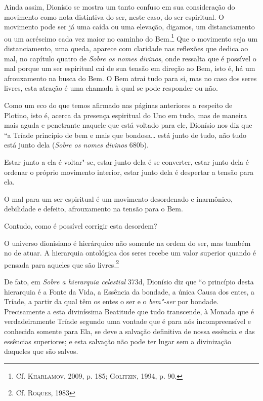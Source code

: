 Ainda assim, Dionísio se mostra um tanto confuso em sua consideração do
movimento como nota distintiva do ser, neste caso, do ser espiritual. O
movimento pode ser já uma caída ou uma elevação, digamos, um distanciamento ou
um acréscimo cada vez maior no caminho do Bem.\footnote{
  Cf. \textsc{Kharlamov}, 2009, p. 185; \textsc{Golitzin}, 1994, p. 90.}  
Que o movimento seja um
distanciamento, uma queda, aparece com claridade nas reflexões que dedica ao
mal, no capítulo quatro de \textit{Sobre os nomes divinos}, onde ressalta que é
possível o mal porque um ser espiritual cai de sua tensão em direção ao Bem,
isto é, há um afrouxamento na busca do Bem. O Bem atrai tudo para si, mas no
caso dos seres livres, esta atração é uma chamada à qual se pode responder ou
não. 

Como um eco do que temos afirmado nas páginas anteriores a respeito de Plotino,
isto é, acerca da presença espiritual do Uno em tudo, mas de maneira mais aguda
e penetrante naquele que está voltado para ele, Dionísio nos diz que ``a Tríade
princípio de bem e mais que bondosa\ldots{} está junto de tudo, não tudo está
junto dela (\textit{Sobre os nomes divinos} 680b).

Estar junto a ela é voltar"-se, estar junto dela é se converter, estar junto 
dela é ordenar o próprio movimento interior, estar junto dela é despertar a
tensão para ela.

O mal para um ser espiritual é um movimento desordenado e inarmônico,
debilidade e defeito, afrouxamento na tensão para o Bem. 

Contudo, como é possível corrigir esta desordem?

O universo dionisiano é hierárquico não somente na ordem do ser, mas também no
de atuar. A hierarquia ontológica dos seres recebe um valor superior quando é
pensada para aqueles que são livres.\footnote{
  Cf. \textsc{Roques}, 1983}

De fato, em \textit{Sobre a hierarquia celestial} 373d, Dionísio diz que ``o
princípio desta hierarquia é a Fonte da Vida, a Essência da bondade, a única
Causa dos entes, a Tríade, a partir da qual têm os entes o ser e o
\textit{bem"-ser} por bondade. Precisamente a esta diviníssima Beatitude que tudo
transcende, à Monada que é verdadeiramente Tríade segundo uma vontade que é para
nós incompreensível e conhecida somente para Ela, se deve a salvação definitiva
de nossa essência e das essências superiores; e esta salvação não pode ter lugar
sem a divinização daqueles que são salvos. 

